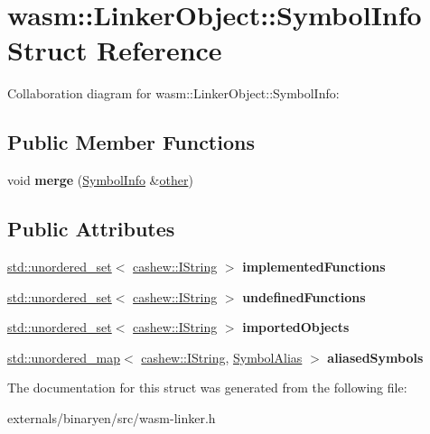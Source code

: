 \hypertarget{structwasm_1_1_linker_object_1_1_symbol_info}{}\section{wasm\+:\+:Linker\+Object\+:\+:Symbol\+Info Struct Reference}
\label{structwasm_1_1_linker_object_1_1_symbol_info}


Collaboration diagram for wasm\+:\+:Linker\+Object\+:\+:Symbol\+Info\+:
\subsection*{Public Member Functions}
\begin{DoxyCompactItemize}
\item 
\mbox{\label{structwasm_1_1_linker_object_1_1_symbol_info_a07e129023486bb4f1506799599fddef7}} 
void {\bfseries merge} (\mbox{\hyperlink{structwasm_1_1_linker_object_1_1_symbol_info}{Symbol\+Info}} \&\mbox{\hyperlink{structother}{other}})
\end{DoxyCompactItemize}
\subsection*{Public Attributes}
\begin{DoxyCompactItemize}
\item 
\mbox{\label{structwasm_1_1_linker_object_1_1_symbol_info_a193b51ce4be81924088c223a862113ef}} 
\mbox{\hyperlink{classstd_1_1unordered__set}{std\+::unordered\+\_\+set}}$<$ \mbox{\hyperlink{structcashew_1_1_i_string}{cashew\+::\+I\+String}} $>$ {\bfseries implemented\+Functions}
\item 
\mbox{\label{structwasm_1_1_linker_object_1_1_symbol_info_a9bd4e76a4fe5774ecd72daa1b8edfd62}} 
\mbox{\hyperlink{classstd_1_1unordered__set}{std\+::unordered\+\_\+set}}$<$ \mbox{\hyperlink{structcashew_1_1_i_string}{cashew\+::\+I\+String}} $>$ {\bfseries undefined\+Functions}
\item 
\mbox{\label{structwasm_1_1_linker_object_1_1_symbol_info_a42bf23384ced11a6755cf851104f6ce9}} 
\mbox{\hyperlink{classstd_1_1unordered__set}{std\+::unordered\+\_\+set}}$<$ \mbox{\hyperlink{structcashew_1_1_i_string}{cashew\+::\+I\+String}} $>$ {\bfseries imported\+Objects}
\item 
\mbox{\label{structwasm_1_1_linker_object_1_1_symbol_info_aa689963a9a0ca9699f7e5fa74f305882}} 
\mbox{\hyperlink{classstd_1_1unordered__map}{std\+::unordered\+\_\+map}}$<$ \mbox{\hyperlink{structcashew_1_1_i_string}{cashew\+::\+I\+String}}, \mbox{\hyperlink{structwasm_1_1_linker_object_1_1_symbol_alias}{Symbol\+Alias}} $>$ {\bfseries aliased\+Symbols}
\end{DoxyCompactItemize}


The documentation for this struct was generated from the following file\+:\begin{DoxyCompactItemize}
\item 
externals/binaryen/src/wasm-\/linker.\+h\end{DoxyCompactItemize}
